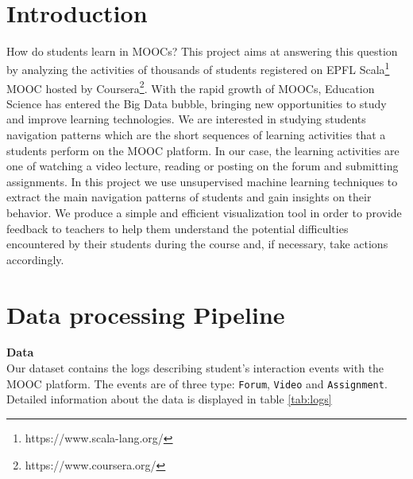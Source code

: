 \documentclass[a0,portrait]{a0poster}
\begin{document}
\begin{minipage}[c]{\linewidth}
{\begin{minipage}[c]{0.15\textwidth}
\end{minipage}}
\\[0.1cm]%
\color{NavyBlue}\setlength\FrameRule{25pt}
\begin{framed}
\vspace{0.2cm}
\begin{multicols}{2} %
\color{Black}
\section*{Introduction}
How do students learn in MOOCs? This project aims at answering this question by analyzing the activities of thousands of students registered on EPFL Scala\footnote{https://www.scala-lang.org/} MOOC hosted by Coursera\footnote{https://www.coursera.org/}. With the rapid growth of MOOCs, Education Science has entered the Big Data bubble, bringing new opportunities to study and improve learning technologies. We are interested in studying students navigation patterns which are the short sequences of learning activities that a students perform on the MOOC platform. In our case, the learning activities are one of watching a video lecture, reading or posting on the forum and submitting assignments. In this project we use unsupervised machine learning techniques to extract the main navigation patterns of students and gain insights on their behavior. We produce a simple and efficient visualization tool in order to provide feedback to teachers to help them understand the potential difficulties encountered by their students during the course and, if necessary, take actions accordingly.

\section*{Data processing Pipeline}

\textbf{Data} \\
Our dataset contains the logs describing student's interaction events with the MOOC platform. The events are of three type: \verb|Forum|, \verb|Video| and \verb|Assignment|. Detailed information about the data is displayed in table \ref{tab:logs}


\end{multicols}
\end{framed}
\end{minipage}
\end{document}
